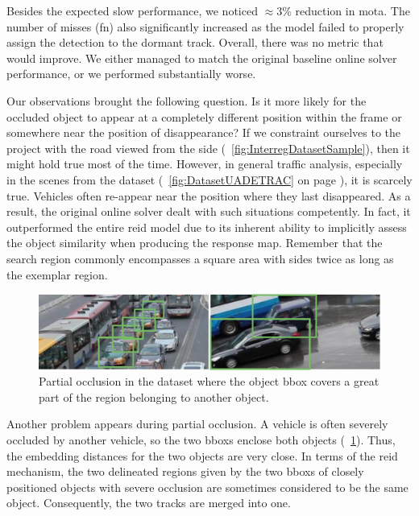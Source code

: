 Besides the expected slow performance, we noticed $\approx 3$\% reduction in \gls{mota}. The number of misses (\gls{fn}) also significantly increased as the model failed to properly assign the detection to the dormant track. Overall, there was no metric that would improve. We either managed to match the original baseline online solver performance, or we performed substantially worse.

Our observations brought the following question. Is it more likely for the occluded object to appear at a completely different position within the frame or somewhere near the position of disappearance? If we constraint ourselves to the \interreg{} project with the road viewed from the side (\figtext{}~\ref{fig:InterregDatasetSample}), then it might hold true most of the time. However, in general traffic analysis, especially in the scenes from the \uadetrac{} dataset (\figtext{}~\ref{fig:DatasetUADETRAC} on page \pageref{fig:DatasetUADETRAC}), it is scarcely true. Vehicles often re-appear near the position where they last disappeared. As a result, the original online solver dealt with such situations competently. In fact, it outperformed the entire \gls{reid} model due to its inherent ability to implicitly assess the object similarity when producing the response map. Remember that the search region commonly encompasses a square area with sides twice as long as the exemplar region.

\begin{figure}[!t]
    \centering
    \includegraphics[width=\linewidth]{figures/siamese_tracking/uadetrac_partial_occlusion_multiple_cars.pdf}
    \caption[Partial occlusion in \uadetrac{} dataset]{Partial occlusion in the \uadetrac{} dataset where the object \gls{bbox} covers a great part of the region belonging to another object.}
    \label{fig:UADETRACPartialOcclusionMultiple}
\end{figure}

Another problem appears during partial occlusion. A vehicle is often severely occluded by another vehicle, so the two \glspl{bbox} enclose both objects (\figtext{}~\ref{fig:UADETRACPartialOcclusionMultiple}). Thus, the embedding distances for the two objects are very close. In terms of the \gls{reid} mechanism, the two delineated regions given by the two \glspl{bbox} of closely positioned objects with severe occlusion are sometimes considered to be the same object. Consequently, the two tracks are merged into one.

